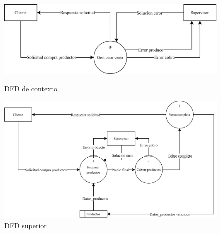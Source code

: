 \documentclass{templateNote}
\begin{document}
\begin{figure}[H]
    \centering
    \includegraphics[width=1\textwidth]{img/dfdcontexto3.png}
    \caption{DFD de contexto}
    \vspace{1cm}
    \includegraphics[width=1\textwidth]{img/dfdsuperior3.png}
    \caption{DFD superior}
\end{figure}
\end{document}
